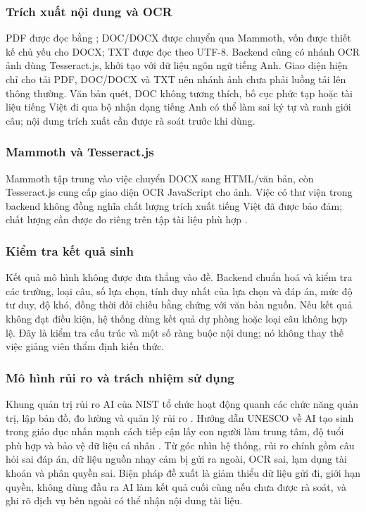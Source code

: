 \subsubsection{Trích xuất nội dung và OCR}
PDF được đọc bằng ; DOC/DOCX được chuyển qua Mammoth, vốn
được thiết kế chủ yếu cho DOCX; TXT được đọc theo UTF-8. Backend cũng có
nhánh OCR ảnh dùng Tesseract.js, khởi tạo với dữ liệu ngôn ngữ tiếng Anh.
Giao diện hiện chỉ cho tải PDF, DOC/DOCX và TXT nên nhánh ảnh chưa phải
luồng tải lên thông thường. Văn bản quét, DOC không tương thích, bố cục phức
tạp hoặc tài liệu tiếng Việt đi qua bộ nhận dạng tiếng Anh có thể làm sai
ký tự và ranh giới câu; nội dung trích xuất cần được rà soát trước khi dùng.

\subsubsection{Mammoth và Tesseract.js}
Mammoth tập trung vào việc chuyển DOCX sang HTML/văn bản, còn Tesseract.js
cung cấp giao diện OCR JavaScript cho ảnh. Việc có thư viện trong backend
không đồng nghĩa chất lượng trích xuất tiếng Việt đã được bảo đảm; chất
lượng cần được đo riêng trên tập tài liệu phù hợp
\cite{MammothDocs,TesseractDocs}.

\subsubsection{Kiểm tra kết quả sinh}
Kết quả mô hình không được đưa thẳng vào đề. Backend chuẩn hoá và kiểm tra
các trường, loại câu, số lựa chọn, tính duy nhất của lựa chọn và đáp án,
mức độ tư duy, độ khó, đồng thời đối chiếu bằng chứng với văn bản nguồn. Nếu
kết quả không đạt điều kiện, hệ thống dùng kết quả dự phòng hoặc loại câu
không hợp lệ. Đây là kiểm tra cấu trúc và một số ràng buộc nội dung; nó
không thay thế việc giảng viên thẩm định kiến thức.

\subsubsection{Mô hình rủi ro và trách nhiệm sử dụng}
Khung quản trị rủi ro AI của NIST tổ chức hoạt động quanh các chức năng
quản trị, lập bản đồ, đo lường và quản lý rủi ro
\cite{NISTAIRMF}. Hướng dẫn UNESCO về AI tạo sinh trong giáo dục nhấn mạnh
cách tiếp cận lấy con người làm trung tâm, độ tuổi phù hợp và bảo vệ dữ
liệu cá nhân \cite{UNESCOGenAI}. Từ góc nhìn hệ thống, rủi ro chính gồm câu
hỏi sai đáp án, dữ liệu nguồn nhạy cảm bị gửi ra ngoài, OCR sai, lạm dụng
tài khoản và phân quyền sai. Biện pháp đề xuất là giảm thiểu dữ liệu gửi
đi, giới hạn quyền, không dùng đầu ra AI làm kết quả cuối cùng nếu chưa
được rà soát, và ghi rõ dịch vụ bên ngoài có thể nhận nội dung tài liệu.

